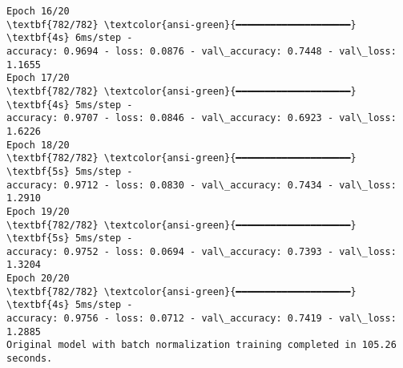 \documentclass[11pt]{article}
\begin{document}
\begin{Verbatim}[commandchars=\\\{\}]
Epoch 16/20
\textbf{782/782} \textcolor{ansi-green}{━━━━━━━━━━━━━━━━━━━━} \textbf{4s} 6ms/step -
accuracy: 0.9694 - loss: 0.0876 - val\_accuracy: 0.7448 - val\_loss: 1.1655
Epoch 17/20
\textbf{782/782} \textcolor{ansi-green}{━━━━━━━━━━━━━━━━━━━━} \textbf{4s} 5ms/step -
accuracy: 0.9707 - loss: 0.0846 - val\_accuracy: 0.6923 - val\_loss: 1.6226
Epoch 18/20
\textbf{782/782} \textcolor{ansi-green}{━━━━━━━━━━━━━━━━━━━━} \textbf{5s} 5ms/step -
accuracy: 0.9712 - loss: 0.0830 - val\_accuracy: 0.7434 - val\_loss: 1.2910
Epoch 19/20
\textbf{782/782} \textcolor{ansi-green}{━━━━━━━━━━━━━━━━━━━━} \textbf{5s} 5ms/step -
accuracy: 0.9752 - loss: 0.0694 - val\_accuracy: 0.7393 - val\_loss: 1.3204
Epoch 20/20
\textbf{782/782} \textcolor{ansi-green}{━━━━━━━━━━━━━━━━━━━━} \textbf{4s} 5ms/step -
accuracy: 0.9756 - loss: 0.0712 - val\_accuracy: 0.7419 - val\_loss: 1.2885
Original model with batch normalization training completed in 105.26 seconds.
    \end{Verbatim}
\end{document}
